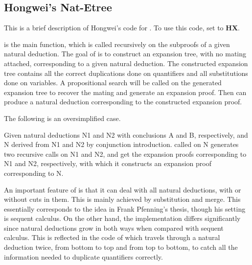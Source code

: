 \subsection{Hongwei's Nat-Etree}

This is a brief description of Hongwei's code
for .  To use this code,
set  to {\bf HX}.


 is the main function, which
is called recursively on the subproofs of a given natural
deduction. The goal of  is to
construct an expansion tree, with no mating attached,
corresponding to a given natural deduction. The constructed
expansion tree contains all the correct duplications done on
quantifiers and all substitutions done on variables.
A propositional search will be called on the generated expansion
tree to recover the mating and generate an expansion proof.
Then  can produce a natural deduction corresponding
to the constructed expansion proof.

The following is an oversimplified case.

Given natural deductions N1 and N2 with conclusions
A and B, respectively, and N derived from N1 and N2
by conjunction introduction. 
called on N generates two recursive calls on N1 and N2,
and get the expansion proofs corresponding to N1 and N2,
respectively, with which it constructs an expansion proof
corresponding to N.

An important feature of  is that
it can deal with all natural deductions, with or without
cuts in them. This is mainly achieved by substitution and
merge. This essentially corresponds to the idea in Frank
Pfenning's thesis, though his setting is sequent calculus.
On the other hand, the implementation differs significantly
since natural deductions grow in both ways when compared with
sequent calculus. This is reflected in the code of
 which travels through a natural
deduction twice, from bottom to top and from top to bottom,
to catch all the information needed to duplicate quantifiers
correctly.

